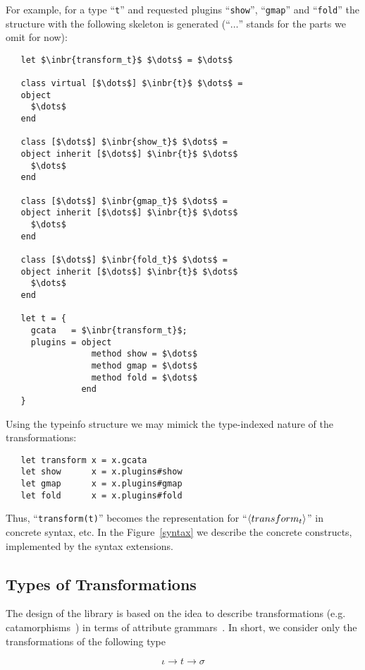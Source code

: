 For example, for a type ``\lstinline{t}'' and requested plugins ``\lstinline{show}'', ``\lstinline{gmap}'' and ``\lstinline{fold}'' the structure with the following skeleton is
generated (``$\dots$'' stands for the parts we omit for now):

\begin{lstlisting}
   let $\inbr{transform_t}$ $\dots$ = $\dots$
   
   class virtual [$\dots$] $\inbr{t}$ $\dots$ =
   object
     $\dots$
   end

   class [$\dots$] $\inbr{show_t}$ $\dots$ =
   object inherit [$\dots$] $\inbr{t}$ $\dots$
     $\dots$
   end

   class [$\dots$] $\inbr{gmap_t}$ $\dots$ =
   object inherit [$\dots$] $\inbr{t}$ $\dots$
     $\dots$
   end

   class [$\dots$] $\inbr{fold_t}$ $\dots$ =
   object inherit [$\dots$] $\inbr{t}$ $\dots$
     $\dots$
   end

   let t = {
     gcata   = $\inbr{transform_t}$;
     plugins = object
                 method show = $\dots$
                 method gmap = $\dots$
                 method fold = $\dots$
               end
   }
\end{lstlisting}

Using the typeinfo structure we may mimick the type-indexed nature of the transformations:

\begin{lstlisting}
   let transform x = x.gcata
   let show      x = x.plugins#show
   let gmap      x = x.plugins#gmap
   let fold      x = x.plugins#fold
\end{lstlisting}

Thus, ``\lstinline{transform(t)}'' becomes the representation for ``$\left<transform_t\right>$'' in concrete syntax, etc. In the
Figure~\ref{syntax} we describe the concrete constructs, implemented by the syntax extensions.

\subsection{Types of Transformations}

The design of the library is based on the idea to describe transformations (e.g. catamorphisms~\cite{Bananas}) in terms of attribute grammars~\cite{AGKnuth,AGSwierstra,ObjectAlgebrasAttribute}.
In short, we consider only the transformations of the following type

\[
\iota \to t \to \sigma
\]

